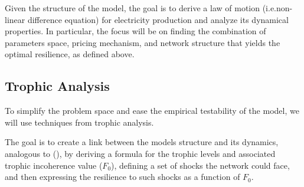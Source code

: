 \documentclass[american]{scrartcl}
\begin{document}
Given the structure of the model, the goal is to derive a law of motion (i.e.non-linear difference equation) for electricity production and analyze its dynamical properties. In particular, the focus will be on finding the combination of parameters space, pricing mechanism, and network structure that yields the optimal resilience, as defined above.

\subsection{Trophic Analysis}

To simplify the problem space and ease the empirical testability of the model, we will use techniques from trophic analysis.

The goal is to create a link between the models structure and its dynamics, analogous to \citeauthor{MacKay2020} (\citeyear[p.~19]{MacKay2020}), by deriving a formula for the trophic levels and associated trophic incoherence value ($F_0$), defining a set of shocks the network could face, and then expressing the resilience to such shocks as a function of $F_0$.
\end{document}

